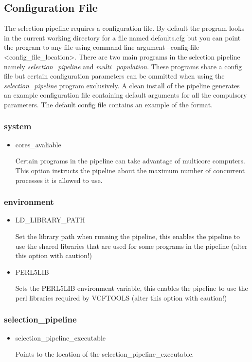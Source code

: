 \documentclass[a4paper,10pt]{article}
\begin{document}
\subsection{Configuration File}
The selection pipeline requires a configuration file. By default the
program looks in the current working directory for a file named
defaults.cfg but you can point the program to any file using command
line argument --config-file <config\_file\_location>. There are two
main programs in the selection pipeline namely
\emph{selection\_pipeline} and \emph{multi\_population}. These
programs share a config file but certain configuration parameters can
be ommitted when using the \emph{selection\_pipeline} program
exclusively. A clean install of the pipeline generates an example
configuration file containing default arguments for all the compulsory
parameters. The default config file contains an example of the format.
\subsubsection{system}
\begin{itemize}
\item cores\_avaliable

Certain programs in the pipeline can take advantage of multicore
computers. This option instructs the pipeline about the maximum number
of concurrent processes it is allowed to use.
\end{itemize}
\subsubsection{environment}
\begin{itemize}
\item LD\_LIBRARY\_PATH

Set the library path when running the pipeline, this enables the
pipeline to use the shared libraries that are used for some programs
in the pipeline (alter this option with caution!)

\item PERL5LIB

Sets the PERL5LIB environment variable, this enables the pipeline to
use the perl libraries required by VCFTOOLS (alter this option with
caution!)

\end{itemize}
\subsubsection{selection\_pipeline}
\begin{itemize}
\item selection\_pipeline\_executable

Points to the location of the selection\_pipeline\_executable. 
\end{itemize}
\end{document}
